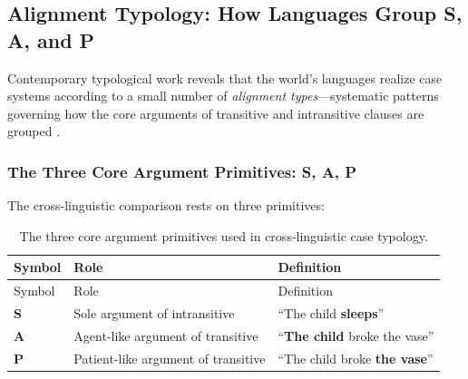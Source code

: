\documentclass[
]{article}
\begin{document}
\subsection{Alignment Typology: How Languages Group S, A, and
P}\label{alignment-typology-how-languages-group-s-a-and-p}

Contemporary typological work reveals that the world's languages realize
case systems according to a small number of \emph{alignment
types}---systematic patterns governing how the core arguments of
transitive and intransitive clauses are grouped
\citep{polinsky2015case, blake2001grammatical, haspelmath2009universality}.

\subsubsection{The Three Core Argument Primitives: S, A,
P}\label{the-three-core-argument-primitives-s-a-p}

The cross-linguistic comparison rests on three primitives:

\begin{longtable}[]{@{}
  >{\centering\arraybackslash}p{}
  >{\raggedright\arraybackslash}p{}
  >{\raggedright\arraybackslash}p{}@{}}
\caption{The three core argument primitives used in cross-linguistic
case typology.}\label{tbl:s-a-p}\tabularnewline
\toprule\noalign{}
\begin{minipage}[b]{\linewidth}\centering
Symbol
\end{minipage} & \begin{minipage}[b]{\linewidth}\raggedright
Role
\end{minipage} & \begin{minipage}[b]{\linewidth}\raggedright
Definition
\end{minipage} \\
\midrule\noalign{}
\endfirsthead
\toprule\noalign{}
\begin{minipage}[b]{\linewidth}\centering
Symbol
\end{minipage} & \begin{minipage}[b]{\linewidth}\raggedright
Role
\end{minipage} & \begin{minipage}[b]{\linewidth}\raggedright
Definition
\end{minipage} \\
\midrule\noalign{}
\endhead
\bottomrule\noalign{}
\endlastfoot
\textbf{S} & Sole argument of intransitive & ``The child
\textbf{sleeps}'' \\
\textbf{A} & Agent-like argument of transitive & ``\textbf{The child}
broke the vase'' \\
\textbf{P} & Patient-like argument of transitive & ``The child broke
\textbf{the vase}'' \\
\end{longtable}
\end{document}
